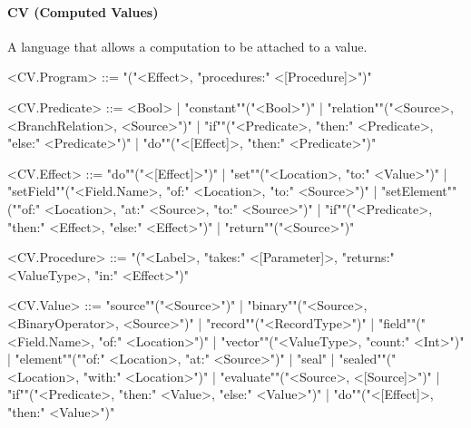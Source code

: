 \documentclass[main.tex]{subfiles}
\begin{document}
\paragraph{ CV (Computed Values) } A language that allows a computation to be attached to a value.
\begin{grammar}
	\footnotesize
				<CV.Program> ::=
							"("<Effect>, "procedures:" <[Procedure]>")"
				\par
				<CV.Predicate> ::=
						<Bool> |
						"constant""("<Bool>")"
						| "relation""("<Source>, <BranchRelation>, <Source>")"
						| "if""("<Predicate>, "then:" <Predicate>, "else:" <Predicate>")"
						| "do""("<[Effect]>, "then:" <Predicate>")"
				\par
				<CV.Effect> ::=
						"do""("<[Effect]>")"
						| "set""("<Location>, "to:" <Value>")"
						| "setField""("<Field.Name>, "of:" <Location>, "to:" <Source>")"
						| "setElement""(""of:" <Location>, "at:" <Source>, "to:" <Source>")"
						| "if""("<Predicate>, "then:" <Effect>, "else:" <Effect>")"
						| "return""("<Source>")"
				\par
				<CV.Procedure> ::=
							"("<Label>, "takes:" <[Parameter]>, "returns:" <ValueType>, "in:" <Effect>")"
				\par
				<CV.Value> ::=
						"source""("<Source>")"
						| "binary""("<Source>, <BinaryOperator>, <Source>")"
						| "record""("<RecordType>")"
						| "field""("<Field.Name>, "of:" <Location>")"
						| "vector""("<ValueType>, "count:" <Int>")"
						| "element""(""of:" <Location>, "at:" <Source>")"
						| "seal"
						| "sealed""("<Location>, "with:" <Location>")"
						| "evaluate""("<Source>, <[Source]>")"
						| "if""("<Predicate>, "then:" <Value>, "else:" <Value>")"
						| "do""("<[Effect]>, "then:" <Value>")"
				\par
\end{grammar}
\par
\end{document}
